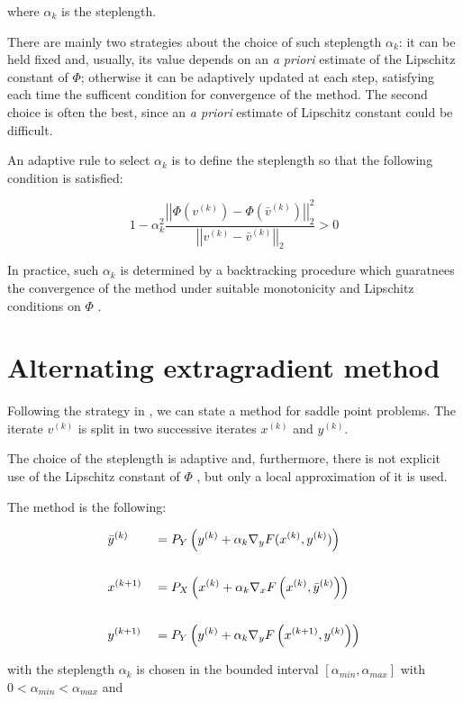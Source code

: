 where $\alpha_k$ is the steplength.

There are mainly two strategies about the choice of such steplength $\alpha_k$: it can be held fixed and, usually, its value depends on an \emph{a priori} estimate of the Lipschitz constant of $\Phi$; otherwise it can be adaptively updated at each step, satisfying each time the sufficent condition for convergence of the method. The second choice is often the best, since an \emph{a priori} estimate of Lipschitz constant could be difficult.

An adaptive rule to select $\alpha_k$ is to define the steplength so that the following condition is satisfied:

$$1-\alpha_k^2 \dfrac{\left|\left|\Phi\left(v^{(k)}\right) - \Phi\left(\bar{v}^{(k)}\right)\right|\right|_2^2}{\left|\left|v^{(k)}-\bar{v}^{(k)}\right|\right|_2} > 0 $$

In practice, such $\alpha_k$ is determined by a backtracking procedure which guaratnees the convergence of the method under suitable monotonicity and Lipschitz conditions on $\Phi$ \citep{khobo}.

\section{Alternating extragradient method}

Following the strategy in \citep{khobo}, we can state a method for saddle point problems. The iterate $v^{(k)}$ is split in two successive iterates $x^{(k)}$ and $y^{(k)}$.

The choice of the steplength is adaptive and, furthermore, there is not explicit use of the Lipschitz constant of $\Phi$ , but only a local approximation of it is used.

The method is the following:

\begin{alignat}{2}
&\label{aem-1} \bar{y}^{(k)} &&= P_Y\left(y^{(k)} + \alpha_k \nabla_y F(x^{(k)},y^{(k)})\right) \\
\notag \\
&\label{aem-2} x^{(k+1)} &&= P_X\left(x^{(k)} + \alpha_k \nabla_x F\left(x^{(k)},\bar{y}^{(k)}\right)\right) \\
\notag \\
&\label{aem-3} y^{(k+1)} &&= P_Y\left(y^{(k)} + \alpha_k \nabla_y F\left(x^{(k+1)},y^{(k)}\right)\right)
\end{alignat}

with the steplength $\alpha_k$ is chosen in the bounded interval $[\alpha_{min}, \alpha_{max}]$ with $0<\alpha_{min}<\alpha_{max}$ and

